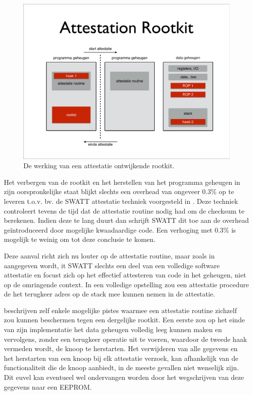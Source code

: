 \begin{figure}
  \centering
  \includegraphics[width=0.9\linewidth]{resources/attestation-rootkit.pdf}
  \caption{De werking van een attestatie ontwijkende rootkit.}
  \label{fig:attestation-rootkit}
\end{figure}

Het verbergen van de rootkit en het herstellen van het programma geheugen in
zijn oorspronkelijke staat blijkt slechts een overhead van ongeveer 0.3\% op te
leveren t.o.v. bv. de SWATT attestatie techniek voorgesteld in
\cite{seshadri2004swatt}. Deze techniek controleert tevens de tijd dat de
attestatie routine nodig had om de checksum te berekenen. Indien deze te lang
duurt dan schrijft SWATT dit toe aan de overhead ge\"introduceerd door
mogelijke kwaadaardige code. Een verhoging met 0.3\% is mogelijk te weinig om
tot deze conclusie te komen.

Deze aanval richt zich nu louter op de attestatie routine, maar zoals in
\cite{perrig2010refutation} aangegeven wordt, it SWATT slechts een deel van een
volledige software attestatie en focust zich op het effectief attesteren van
code in het geheugen, niet op de omringende context. In een volledige
opstelling zou een attestatie procedure de het terugkeer adres op de stack mee
kunnen nemen in de attestatie.

\cite{castelluccia2009difficulty} beschrijven zelf enkele mogelijke pistes
waarmee een attestatie routine zichzelf zou kunnen beschermen tegen een
dergelijke rootkit. Een eerste zou op het einde van zijn implementatie het data
geheugen volledig leeg kunnen maken en vervolgens, zonder een terugkeer
operatie uit te voeren, waardoor de tweede haak vermeden wordt, de knoop te
herstarten. Het verwijderen van alle gegevens en het herstarten van een knoop
bij elk attestatie verzoek, kan afhankelijk van de functionaliteit die de knoop
aanbiedt, in de meeste gevallen niet wenselijk zijn. Dit euvel kan eventueel
wel ondervangen worden door het wegschrijven van deze gegevens naar een EEPROM.

